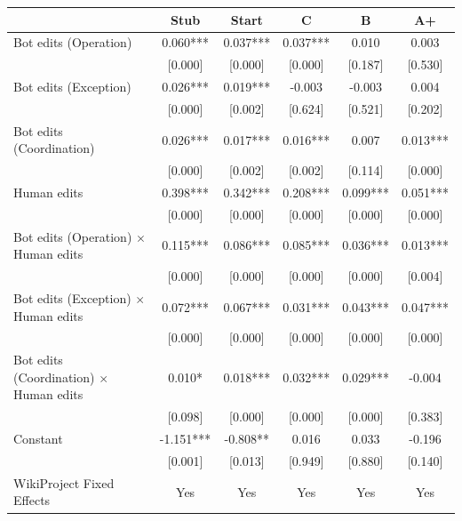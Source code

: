 {
\def\sym#1{\ifmmode^{#1}\else\(^{#1}\)\fi}
\begin{tabular}{l*{5}{c}}
\toprule
                    &\multicolumn{1}{c}{Stub}&\multicolumn{1}{c}{Start}&\multicolumn{1}{c}{C}&\multicolumn{1}{c}{B}&\multicolumn{1}{c}{A+}\\
\midrule
Bot edits (Operation)&     0.060***&     0.037***&     0.037***&     0.010   &     0.003   \\
                    &   [0.000]   &   [0.000]   &   [0.000]   &   [0.187]   &   [0.530]   \\
Bot edits (Exception)&     0.026***&     0.019***&    -0.003   &    -0.003   &     0.004   \\
                    &   [0.000]   &   [0.002]   &   [0.624]   &   [0.521]   &   [0.202]   \\
Bot edits (Coordination)&     0.026***&     0.017***&     0.016***&     0.007   &     0.013***\\
                    &   [0.000]   &   [0.002]   &   [0.002]   &   [0.114]   &   [0.000]   \\
Human edits         &     0.398***&     0.342***&     0.208***&     0.099***&     0.051***\\
                    &   [0.000]   &   [0.000]   &   [0.000]   &   [0.000]   &   [0.000]   \\
Bot edits (Operation) $\times$ Human edits&     0.115***&     0.086***&     0.085***&     0.036***&     0.013***\\
                    &   [0.000]   &   [0.000]   &   [0.000]   &   [0.000]   &   [0.004]   \\
Bot edits (Exception) $\times$ Human edits&     0.072***&     0.067***&     0.031***&     0.043***&     0.047***\\
                    &   [0.000]   &   [0.000]   &   [0.000]   &   [0.000]   &   [0.000]   \\
Bot edits (Coordination) $\times$ Human edits&     0.010*  &     0.018***&     0.032***&     0.029***&    -0.004   \\
                    &   [0.098]   &   [0.000]   &   [0.000]   &   [0.000]   &   [0.383]   \\
Constant            &    -1.151***&    -0.808** &     0.016   &     0.033   &    -0.196   \\
                    &   [0.001]   &   [0.013]   &   [0.949]   &   [0.880]   &   [0.140]   \\
WikiProject Fixed Effects&       Yes   &       Yes   &       Yes   &       Yes   &       Yes   \\

\end{tabular}}
